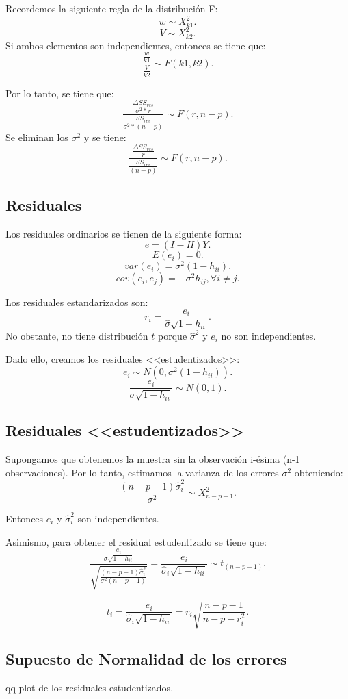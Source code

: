 \documentclass{article}
\begin{document}
Recordemos la siguiente regla de la distribución F:
\[ w \sim X^{2}_{k1} .\]
\[ V \sim X^{2}_{k2} .\]
Si ambos elementos son independientes, entonces se tiene que:
\[ \frac{\frac{w}{k1}}{\frac{V}{k2}}\sim F(k1,k2) .\]

Por lo tanto, se tiene que:
\[ \frac{\frac{\Delta SS_{res}}{\sigma^{2} * r}}{\frac{SS_{res}}{\sigma^{2}*(n-p)}}\sim F(r,n-p) .\]
Se eliminan los $\sigma^{2}$ y se tiene:
\[ \frac{\frac{\Delta SS_{res}}{r}}{\frac{SS_{res}}{(n-p)}}\sim F(r,n-p) .\]

\subsection{Residuales}
Los residuales ordinarios se tienen de la siguiente forma:
\[ e=(I-H)Y .\]
\[ E(e_{i})=0 .\]
\[ var(e_{i})=\sigma^{2}(1-h_{ii}) .\]
\[ cov(e_{i},e_{j})=-\sigma^{2}h_{ij}, \forall i \neq j .\]

Los residuales estandarizados son:
\[ r_{i}=\frac{e_{i}}{\hat{\sigma}\sqrt{1-h_{ii}}} .\]
No obstante, no tiene distribución $t$ porque $\hat{\sigma}^{2}$ y $e_{i}$ no son independientes.

Dado ello, creamos los residuales <<estudentizados>>:
\[ e_{i}\sim N(0,\sigma^{2}(1-h_{ii})) .\]
\[ \frac{e_{i}}{\sigma \sqrt{1-h_{ii}}} \sim N(0,1).\]

\subsection{Residuales <<estudentizados>>}
Supongamos que obtenemos la muestra sin la observación i-ésima (n-1 observaciones). Por lo tanto, estimamos la varianza de los errores $\sigma^{2}$ obteniendo:
\[ \frac{(n-p-1)\hat{\sigma}^{2}_{i}}{\sigma^{2}} \sim X^{2}_{n-p-1}
.\]

Entonces $e_{i}$ y $\hat{\sigma}^{2}_{i}$ son independientes.

Asimismo, para obtener el residual estudentizado se tiene que:
\[ \frac{\frac{e_{i}}{\sigma \sqrt{1-h_{ii}}}}{\sqrt{\frac{(n-p-1)\hat{\sigma}^{2}_{i}}{\sigma^{2}(n-p-1)}}}=\frac{e_{i}}{\hat{\sigma}_{i}\sqrt{1-h_{ii}}} \sim  t_{(n-p-1)} .\]

\[ t_{i}=\frac{e_{i}}{\hat{\sigma}_{i}\sqrt{1-h_{ii}}}=r_{i}\sqrt{\frac{n-p-1}{n-p-r_{i}^{2}}} .\]

\subsection{Supuesto de Normalidad de los errores}
qq-plot de los residuales estudentizados.
\end{document}
